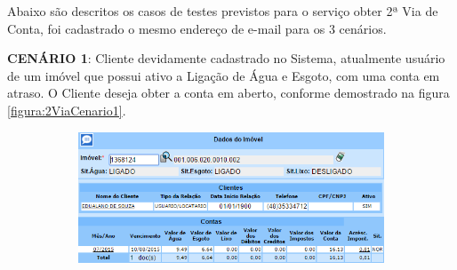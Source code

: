 Abaixo são descritos os casos de testes previstos para o serviço obter 2ª Via de Conta, foi cadastrado o mesmo endereço de e-mail para os 3 cenários.
\begin{flushleft}
	\begin{description}
		\item \textbf{CENÁRIO 1}: Cliente devidamente cadastrado no Sistema, atualmente usuário de um imóvel que possui ativo a Ligação de Água e Esgoto, com uma conta em atraso. O Cliente deseja obter a conta em aberto, conforme demostrado na figura \ref{figura:2ViaCenario1}.
		
		\begin{figure}[H]
			\centering
			\caption{Obter 2ª via - Cenário de Teste 1}
			\label{figura:2ViaCenario1}
			\begin{subfigure}[H]{\textwidth}
				\centering
				\includegraphics{figuras/cenarios/segunda_via/cenario_1.PNG}
			\end{subfigure}
		\end{figure}
	\end{description}
	

\end{flushleft}
